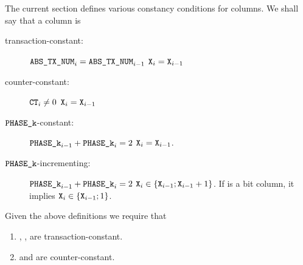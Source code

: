 The current section defines various constancy conditions for columns.
We shall say that a column  is
\begin{description}
	\item[transaction-constant:]
		\If $\texttt{ABS\_TX\_NUM}_{i} = \texttt{ABS\_TX\_NUM}_{i-1}$ \Then $\texttt{X}_{i} = \texttt{X}_{i-1}$
	\item[counter-constant:]
		\If $\texttt{CT}_{i} \neq 0$ \Then $\texttt{X}_{i} = \texttt{X}_{i-1}$
	\item[$\texttt{PHASE\_k}$-constant:]
		\If $\texttt{PHASE\_k}_{i-1} + \texttt{PHASE\_k}_{i} = 2$ \Then $\texttt{X}_{i} = \texttt{X}_{i-1}$.
	\item[$\texttt{PHASE\_k}$-incrementing:]
		\If $\texttt{PHASE\_k}_{i-1} + \texttt{PHASE\_k}_{i} = 2$ \Then $\texttt{X}_{i} \in \{\texttt{X}_{i-1}; \texttt{X}_{i-1} + 1 \}$. If  is a bit column, it implies $\texttt{X}_{i} \in \{\texttt{X}_{i-1}; 1 \}$.
\end{description}


Given the above definitions we require that
\begin{enumerate}
	\item \typeZeroTx{}, \typeOneTx{}, \typeTwoTx{} are transaction-constant. 
	\item \lt{} and \lx{} are counter-constant. 
\end{enumerate}